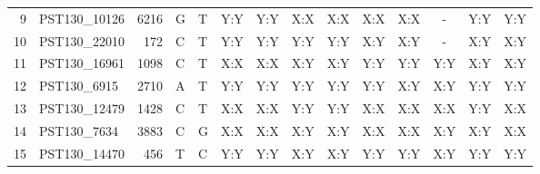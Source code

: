 \begin{sidewaystable}
\begin{localsize}{6}{7}
\begin{tabular}{rlrll|cc|cc|ccc|cc}
  9  & PST130\_10126 & 6216     & G        & T        & Y:Y                & Y:Y    & X:X                 & X:X    & X:X                  & X:X   & -      & Y:Y                 & Y:Y   \\
  10 & PST130\_22010 & 172      & C        & T        & Y:Y                & Y:Y    & Y:Y                 & Y:Y    & X:Y                  & X:Y   & -      & X:Y                 & X:Y   \\
  11 & PST130\_16961 & 1098     & C        & T        & X:X                & X:X    & X:Y                 & X:Y    & Y:Y                  & Y:Y   & Y:Y    & X:Y                 & X:Y   \\
  12 & PST130\_6915  & 2710     & A        & T        & Y:Y                & Y:Y    & Y:Y                 & Y:Y    & Y:Y                  & X:Y   & X:Y    & Y:Y                 & Y:Y   \\
  13 & PST130\_12479 & 1428     & C        & T        & X:X                & X:X    & Y:Y                 & Y:Y    & X:X                  & X:X   & X:X    & Y:Y                 & X:X   \\
  14 & PST130\_7634  & 3883     & C        & G        & X:X                & X:X    & X:Y                 & X:Y    & X:X                  & X:X   & X:Y    & X:Y                 & X:X   \\
  15 & PST130\_14470 & 456      & T        & C        & Y:Y                & Y:Y    & X:Y                 & X:Y    & Y:Y                  & Y:Y   & X:Y    & Y:Y                 & Y:Y   \\
\bottomrule
\end{tabular}
\end{localsize}
\end{sidewaystable}
